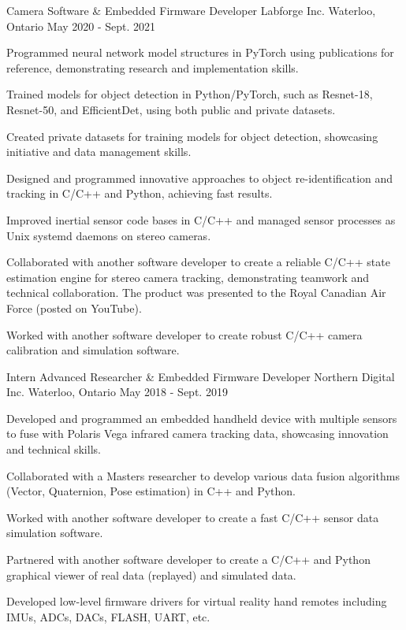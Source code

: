 \begin{cventries}
  \cventry
    {Camera Software \& Embedded Firmware Developer} %
    {Labforge Inc.} %
    {Waterloo, Ontario} %
    {May 2020 - Sept. 2021} %
    {
      \begin{cvitems} %
        \item {Programmed neural network model structures in PyTorch using publications for reference, demonstrating research and implementation skills.}
        \item {Trained models for object detection in Python/PyTorch, such as Resnet-18, Resnet-50, and EfficientDet, using both public and private datasets.}
        \item {Created private datasets for training models for object detection, showcasing initiative and data management skills.}
        \item {Designed and programmed innovative approaches to object re-identification and tracking in C/C++ and Python, achieving fast results.}
        \item {Improved inertial sensor code bases in C/C++ and managed sensor processes as Unix systemd daemons on stereo cameras.}
        \item {Collaborated with another software developer to create a reliable C/C++ state estimation engine for stereo camera tracking, demonstrating teamwork and technical collaboration. The product was presented to the Royal Canadian Air Force (posted on YouTube).}
        \item {Worked with another software developer to create robust C/C++ camera calibration and simulation software.}
      \end{cvitems}
    }

  \cventry
    {Intern Advanced Researcher \& Embedded Firmware Developer} %
    {Northern Digital Inc.} %
    {Waterloo, Ontario} %
    {May 2018 - Sept. 2019} %
    {
      \begin{cvitems} %
        \item {Developed and programmed an embedded handheld device with multiple sensors to fuse with Polaris Vega infrared camera tracking data, showcasing innovation and technical skills.}
        \item {Collaborated with a Masters researcher to develop various data fusion algorithms (Vector, Quaternion, Pose estimation) in C++ and Python.}
        \item {Worked with another software developer to create a fast C/C++ sensor data simulation software.}
        \item {Partnered with another software developer to create a C/C++ and Python graphical viewer of real data (replayed) and simulated data.}
        \item {Developed low-level firmware drivers for virtual reality hand remotes including IMUs, ADCs, DACs, FLASH, UART, etc.}
      \end{cvitems}
    }


\end{cventries}

